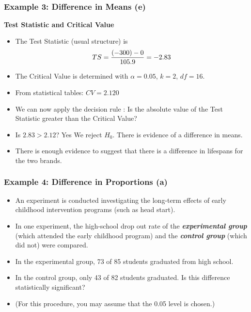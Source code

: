 \documentclass[a4]{beamer}
\begin{document}
\begin{frame}
\frametitle{Example 3: Difference in Means (e) }
\textbf{Test Statistic and Critical Value}\\
\begin{itemize}
\item The Test Statistic (usual structure) is \[ TS  = {(-300) - 0 \over 105.9}  = -2.83 \]
\item The Critical Value is determined  with $\alpha = 0.05$, $k=2$, $df = 16 $. 
\item From statistical tables: $CV = 2.120$
\item We can now apply the decision rule : Is the absolute value of the Test Statistic greater than the Critical Value?
\item Is $2.83 > 2.12$? Yes We reject $H_0$. There is evidence of a difference in means. 
\item There is enough evidence to suggest that there is a difference in lifespans for the two brands.
\end{itemize}
\end{frame}




\begin{frame}
\frametitle{Example 4: Difference in Proportions (a)}
\begin{itemize}
\item An experiment is conducted investigating the long-term effects of early childhood intervention programs (such as head start).
\item In one experiment, the high-school drop out rate of the \textit{\textbf{experimental group}} (which attended the early childhood program)
 and the \textit{\textbf{control group}} (which did not) were compared.
\item In the experimental group, 73 of 85 students graduated from high school. \item In the control group, only 43 of 82 students graduated.
Is this difference statistically significant? \item(For this procedure, you may assume that the 0.05 level is chosen.) \end{itemize}
\end{frame}
\end{document}
